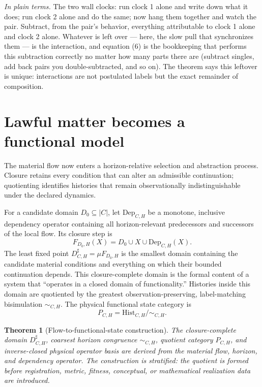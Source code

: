 \documentclass[11pt]{article}
\newtheorem{theorem}{Theorem}
\theoremstyle{definition}
\newcommand{\plainterms}{\emph{In plain terms.}}
\begin{document}
\noindent\plainterms{} The two wall clocks: run clock 1 alone and write down what it does; run clock 2 alone and do the same; now hang them together and watch the pair. Subtract, from the pair's behavior, everything attributable to clock 1 alone and clock 2 alone. Whatever is left over --- here, the slow pull that synchronizes them --- is the interaction, and equation (6) is the bookkeeping that performs this subtraction correctly no matter how many parts there are (subtract singles, add back pairs you double-subtracted, and so on). The theorem says this leftover is unique: interactions are not postulated labels but the exact remainder of composition.

\section{Lawful matter becomes a functional model}

The material flow now enters a horizon-relative selection and abstraction process. Closure retains every condition that can alter an admissible continuation; quotienting identifies histories that remain observationally indistinguishable under the declared dynamics.

For a candidate domain $D_0 \subseteq |C|$, let $\mathrm{Dep}_{C,H}$ be a monotone, inclusive dependency operator containing all horizon-relevant predecessors and successors of the local flow. Its closure step is
\begin{equation}
F_{D_0,H}(X) = D_0 \cup X \cup \mathrm{Dep}_{C,H}(X). \tag{9}
\end{equation}
The least fixed point $D^{\sharp}_{C,H} = \mu F_{D_0,H}$ is the smallest domain containing the candidate material conditions and everything on which their bounded continuation depends. This closure-complete domain is the formal content of a system that ``operates in a closed domain of functionality.'' Histories inside this domain are quotiented by the greatest observation-preserving, label-matching bisimulation $\sim_{C,H}$. The physical functional state category is
\begin{equation}
P_{C,H} = \mathrm{Hist}_{C,H} / \sim_{C,H}. \tag{10}
\end{equation}

\begin{theorem}[Flow-to-functional-state construction]
\label{thm:flow-to-functional}
The closure-complete domain $D^{\sharp}_{C,H}$, coarsest horizon congruence $\sim_{C,H}$, quotient category $P_{C,H}$, and inverse-closed physical operator basis are derived from the material flow, horizon, and dependency operator. The construction is stratified: the quotient is formed before registration, metric, fitness, conceptual, or mathematical realization data are introduced.
\end{theorem}
\end{document}
